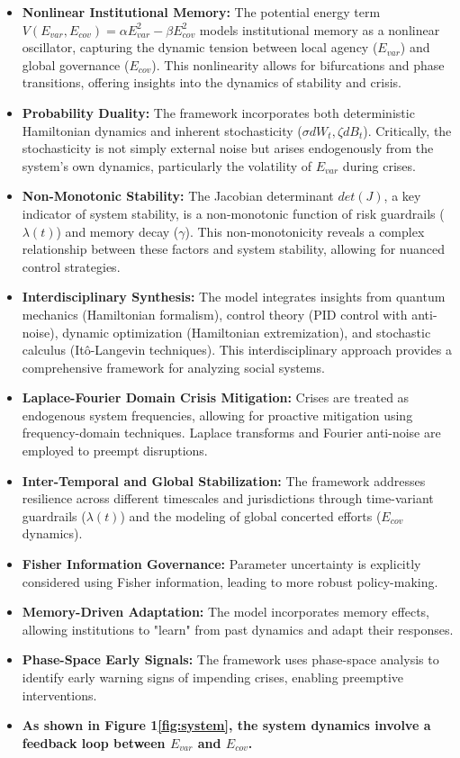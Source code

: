 \documentclass{article}
\theoremstyle{definition}
\begin{document}
\begin{itemize}
    \item \textbf{Nonlinear Institutional Memory:} The potential energy term $V(E_{var}, E_{cov}) = \alpha E_{var}^2 - \beta E_{cov}^2$ models institutional memory as a nonlinear oscillator, capturing the dynamic tension between local agency ($E_{var}$) and global governance ($E_{cov}$).  This nonlinearity allows for bifurcations and phase transitions, offering insights into the dynamics of stability and crisis.
    \item \textbf{Probability Duality:} The framework incorporates both deterministic Hamiltonian dynamics and inherent stochasticity ($\sigma dW_t, \zeta dB_t$).  Critically, the stochasticity is not simply external noise but arises endogenously from the system's own dynamics, particularly the volatility of $E_{var}$ during crises.
    \item \textbf{Non-Monotonic Stability:}  The Jacobian determinant $det(J)$, a key indicator of system stability, is a non-monotonic function of risk guardrails ($\lambda(t)$) and memory decay ($\gamma$). This non-monotonicity reveals a complex relationship between these factors and system stability, allowing for nuanced control strategies.
    \item \textbf{Interdisciplinary Synthesis:} The model integrates insights from quantum mechanics (Hamiltonian formalism), control theory (PID control with anti-noise), dynamic optimization (Hamiltonian extremization), and stochastic calculus (Itô-Langevin techniques). This interdisciplinary approach provides a comprehensive framework for analyzing social systems.
    \item \textbf{Laplace-Fourier Domain Crisis Mitigation:} Crises are treated as endogenous system frequencies, allowing for proactive mitigation using frequency-domain techniques. Laplace transforms and Fourier anti-noise are employed to preempt disruptions.
    \item \textbf{Inter-Temporal and Global Stabilization:} The framework addresses resilience across different timescales and jurisdictions through time-variant guardrails ($\lambda(t)$) and the modeling of global concerted efforts ($E_{cov}$ dynamics).
    \item \textbf{Fisher Information Governance:}  Parameter uncertainty is explicitly considered using Fisher information, leading to more robust policy-making.
    \item \textbf{Memory-Driven Adaptation:}  The model incorporates memory effects, allowing institutions to "learn" from past dynamics and adapt their responses.
    \item \textbf{Phase-Space Early Signals:}  The framework uses phase-space analysis to identify early warning signs of impending crises, enabling preemptive interventions.
    \item \textbf{As shown in Figure 1\ref{fig:system}, the system dynamics involve a feedback loop between $E_{var}$ and $E_{cov}$.}\\
\end{itemize}
\end{document}
